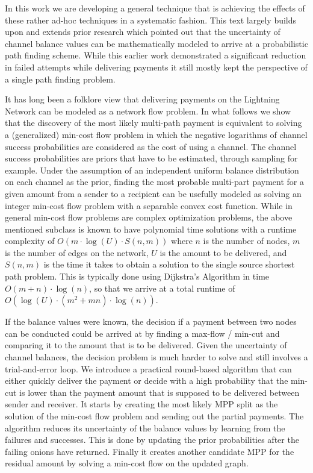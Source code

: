\documentclass[10pt,twocolumn]{article}
\begin{document}
In this work we are developing a general technique that is achieving the effects of these rather ad-hoc techniques in a systematic fashion.
This text largely builds upon and extends prior research which pointed out that
the uncertainty of channel balance values can be mathematically modeled to
arrive at a probabilistic path finding scheme\cite{pickhardt2021security}. While
this earlier work demonstrated a significant reduction in failed attempts while
delivering payments it still mostly kept the perspective of a single path finding
problem.

It has long been a folklore view that delivering payments on the Lightning Network can be modeled as a network flow problem.
In what follows we show that the discovery of the most likely multi-path payment is equivalent to solving a (generalized) min-cost flow problem in which the negative logarithms of channel success probabilities are considered as the cost of using a channel.
The channel success probabilities are priors that have to be estimated, through sampling for example.
Under the assumption of an independent uniform balance distribution on each channel as the prior, finding the most probable multi-part payment for a given amount from a sender to a recipient can be usefully modeled as solving an integer min-cost flow problem with a separable convex cost function.
While in general min-cost flow problems are complex
optimization problems, the above mentioned subclass is known to have polynomial
time solutions with a runtime complexity of $O(m \cdot \log(U) \cdot S(n,m))$
where $n$ is the number of nodes, $m$ is the number of edges on the network, $U$
is the amount to be delivered, and $S(n,m)$ is the time it takes to obtain a
solution to the single source shortest path problem\cite{Minoux1986,ahuja1993network}. This
is typically done using Dijkstra's Algorithm in time $O(m+n) \cdot \log(n)$, so
that we arrive at a total runtime of $O(\log(U)\cdot(m^2+mn)\cdot\log(n))$.

If the balance values were known, the decision if a payment between two nodes can be conducted could be arrived at by finding a max-flow / min-cut and comparing it to the amount that is to be delivered.
Given the uncertainty of channel balances, the decision problem is much harder to solve and still involves a trial-and-error loop.
We introduce a practical round-based algorithm that can either quickly deliver the payment or decide with a high probability that the min-cut is lower than the payment amount that is supposed to be delivered between sender and receiver.
It starts by creating the most likely MPP split as the solution of the min-cost flow problem and sending out the partial payments.
The algorithm reduces its uncertainty of the balance values by learning from the failures and successes.
This is done by updating the prior probabilities after the failing onions have returned.
Finally it creates another candidate MPP for the residual amount by solving a min-cost flow on the updated graph.
\end{document}
